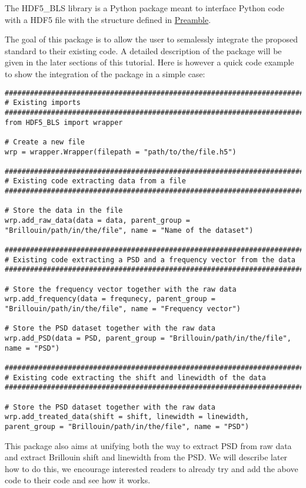 The HDF5\_BLS library is a Python package meant to interface Python code with a HDF5 file with the structure defined in \hyperref[chap:preamble]{Preamble}.

The goal of this package is to allow the user to semalessly integrate the proposed standard to their existing code. A detailed description of the package will be given in the later sections of this tutorial. Here is however a quick code example to show the integration of the package in a simple case:

\begin{lstlisting}
###############################################################################
# Existing imports
###############################################################################
from HDF5_BLS import wrapper

# Create a new file
wrp = wrapper.Wrapper(filepath = "path/to/the/file.h5")

###############################################################################
# Existing code extracting data from a file
###############################################################################

# Store the data in the file 
wrp.add_raw_data(data = data, parent_group = "Brillouin/path/in/the/file", name = "Name of the dataset")

###############################################################################
# Existing code extracting a PSD and a frequency vector from the data
###############################################################################

# Store the frequency vector together with the raw data
wrp.add_frequency(data = frequnecy, parent_group = "Brillouin/path/in/the/file", name = "Frequency vector")

# Store the PSD dataset together with the raw data
wrp.add_PSD(data = PSD, parent_group = "Brillouin/path/in/the/file", name = "PSD")

###############################################################################
# Existing code extracting the shift and linewidth of the data
###############################################################################

# Store the PSD dataset together with the raw data
wrp.add_treated_data(shift = shift, linewidth = linewidth, parent_group = "Brillouin/path/in/the/file", name = "PSD")
\end{lstlisting}

This package also aims at unifying both the way to extract PSD from raw data and extract Brillouin shift and linewidth from the PSD. We will describe later how to do this, we encourage interested readers to already try and add the above code to their code and see how it works. 